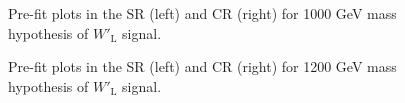\begin{figure}[H]
  \centering
  \caption{Pre-fit plots in the SR (left) and CR (right) for 1000 GeV mass hypothesis of $W'_{\text{L}}$ signal.}
  \label{fig:Prefit_WpLH1000_Asimov}
\end{figure}
\begin{figure}[H]
  \centering
  \caption{Pre-fit plots in the SR (left) and CR (right) for 1200 GeV mass hypothesis of $W'_{\text{L}}$ signal.}
  \label{fig:Prefit_WpLH1200_Asimov}
\end{figure}
